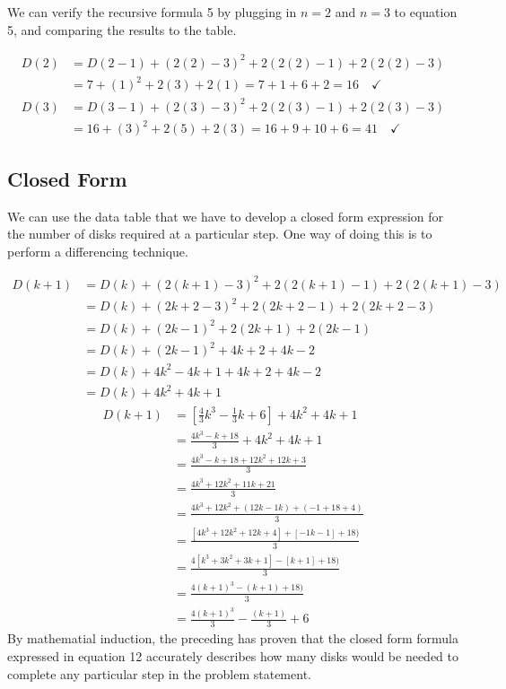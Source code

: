 \documentclass[11pt]{article}
\begin{document}
	We can verify the recursive formula 5 by plugging in $n=2$ and $n=3$ to equation 5, and comparing the results to the table.

	\begin{align*}
		D(2)&= D(2-1)+(2(2)-3)^2+2(2(2)-1)+2(2(2)-3) \\
		&=7+(1)^2+2(3)+2(1)=7+1+6+2=16 \quad \checkmark \\
		D(3)&= D(3-1)+(2(3)-3)^2+2(2(3)-1)+2(2(3)-3) \\
		&=16+(3)^2+2(5)+2(3)=16+9+10+6=41 \quad \checkmark
	\end{align*}

	\newpage
	
	\subsection{Closed Form}

	We can use the data table that we have to develop a closed form expression for the number of disks required at a particular step.  One way of doing this is to perform a differencing
	technique.  

	\begin{align}
		D(k+1)&=D(k)+(2(k+1)-3)^2+2(2(k+1)-1)+2(2(k+1)-3)\\
		&=D(k)+(2k+2-3)^2+2(2k+2-1)+2(2k+2-3)\\
		&=D(k)+(2k-1)^2+2(2k+1)+2(2k-1)\\
		&=D(k)+(2k-1)^2+4k+2+4k-2\\
		&=D(k)+4k^2-4k+1+4k+2+4k-2\\
		&=D(k)+4k^2+4k+1		
	\end{align}
	\begin{align}
		D(k+1)&=[\frac{4}{3}k^3-\frac{1}{3}k+6]+4k^2+4k+1\\	
		&=\frac{4k^3-k+18}{3}+4k^2+4k+1\\
		&=\frac{4k^3-k+18+12k^2+12k+3}{3}\\
		&=\frac{4k^3+12k^2+11k+21}{3}\\
		&=\frac{4k^3+12k^2+(12k-1k)+(-1+18+4)}{3}\\
		&=\frac{[4k^3+12k^2+12k+4]+[-1k-1]+18)}{3}\\
		&=\frac{4[k^3+3k^2+3k+1]-[k+1]+18)}{3}\\
		&=\frac{4(k+1)^3-(k+1)+18)}{3}\\
		&=\frac{4(k+1)^3}{3}-\frac{(k+1)}{3}+6
	\end{align}
	By mathematial induction, the preceding has proven that the closed form formula expressed in equation 12 accurately describes how many 
	disks would be needed to complete any particular step in the problem statement.
\end{document}
